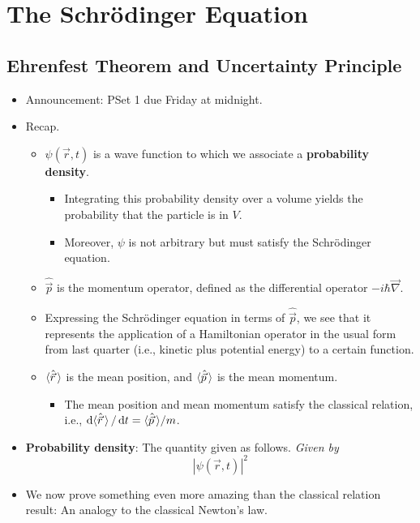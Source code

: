\documentclass[../notes.tex]{subfiles}
\begin{document}
\chapter{The Schr\"{o}dinger Equation}
\section{Ehrenfest Theorem and Uncertainty Principle}
\begin{itemize}
    \item {}Announcement: PSet 1 due Friday at midnight.
    \item Recap.
    \begin{itemize}
        \item $\psi(\vec{r},t)$ is a wave function to which we associate a \textbf{probability density}.
        \begin{itemize}
            \item Integrating this probability density over a volume yields the probability that the particle is in $V$.
            \item Moreover, $\psi$ is not arbitrary but must satisfy the Schr\"{o}dinger equation.
        \end{itemize}
        \item $\hat{\vec{p}}$ is the momentum operator, defined as the differential operator $-i\hbar\vec{\nabla}$.
        \item Expressing the Schr\"{o}dinger equation in terms of $\hat{\vec{p}}$, we see that it represents the application of a Hamiltonian operator in the usual form from last quarter (i.e., kinetic plus potential energy) to a certain function.
        \item $\langle{\hat{\vec{r}}}\,\rangle$ is the mean position, and $\langle{\hat{\vec{p}}}\,\rangle$ is the mean momentum.
        \begin{itemize}
            \item The mean position and mean momentum satisfy the classical relation, i.e., $\dd{\langle{\hat{\vec{r}}}\,\rangle}/\dd{t}=\langle{\hat{\vec{p}}}\,\rangle/m$.
        \end{itemize}
    \end{itemize}
    \item \textbf{Probability density}: The quantity given as follows. \emph{Given by}
    \begin{equation*}
        |\psi(\vec{r},t)|^2
    \end{equation*}
    \item We now prove something even more amazing than the classical relation result: An analogy to the classical Newton's law.

\end{itemize}
\end{document}
